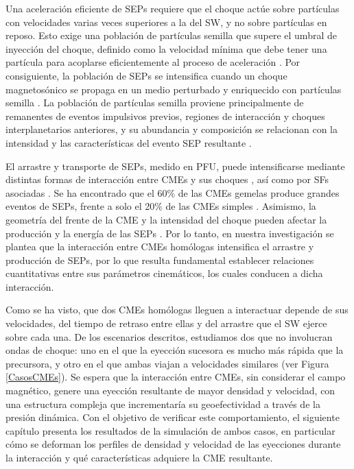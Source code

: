 Una aceleración eficiente de \acp{SEP} requiere que el choque actúe sobre partículas con velocidades varias veces superiores a la del \ac{SW}, y no sobre partículas en reposo. Esto exige una población de partículas semilla que supere el umbral de inyección del choque, definido como la velocidad mínima que debe tener una partícula para acoplarse eficientemente al proceso de aceleración \parencite{desai-2003, tylka-2006}. Por consiguiente, la población de SEPs se intensifica cuando un choque magnetosónico se propaga en un medio perturbado y enriquecido con partículas semilla \parencite[e.g.,][]{2004ApJ...616L.171S, gopalswamy-2004, lugaz-2005, li-2012}. La población de partículas semilla proviene principalmente de remanentes de eventos impulsivos previos, regiones de interacción y choques interplanetarios anteriores, y su abundancia y composición se relacionan con la intensidad y las características del evento \ac{SEP} resultante \parencite{kahler-2001, wijsen-2023}.

El arrastre y transporte de \acp{SEP}, medido en \ac{PFU}, puede intensificarse mediante distintas formas de interacción entre CMEs y sus choques \parencite[e.g.,][]{gopalswamy-2002, desai-2016, kahler-1987}, así como por \acp{SF} asociadas \parencite[e.g.,][]{lin-1976}. Se ha encontrado que el 60$\%$ de las \acp{CME} gemelas produce grandes eventos de SEPs, frente a solo el 20$\%$ de las \acp{CME} simples \parencite[e.g.,][]{lugaz-2017, ding-2013}. Asimismo, la geometría del frente de la \ac{CME} y la intensidad del choque pueden afectar la producción y la energía de las SEPs \parencite[e.g.,][]{kouloumvakos-2019}. Por lo tanto, en nuestra investigación se plantea que la interacción entre CMEs homólogas intensifica el arrastre y producción de \acp{SEP}, por lo que resulta fundamental establecer relaciones cuantitativas entre sus parámetros cinemáticos, los cuales conducen a dicha interacción.

Como se ha visto, que dos CMEs homólogas lleguen a interactuar depende de sus velocidades, del tiempo de retraso entre ellas y del arrastre que el \ac{SW} ejerce sobre cada una. De los escenarios descritos, estudiamos dos que no involucran ondas de choque: uno en el que la eyección sucesora es mucho más rápida que la precursora, y otro en el que ambas viajan a velocidades similares (ver Figura \ref{CasosCMEs}). Se espera que la interacción entre CMEs, sin considerar el campo magnético, genere una eyección resultante de mayor densidad y velocidad, con una estructura compleja que incrementaría su geoefectividad a través de la presión dinámica. Con el objetivo de verificar este comportamiento, el siguiente capítulo presenta los resultados de la simulación de ambos casos, en particular cómo se deforman los perfiles de densidad y velocidad de las eyecciones durante la interacción y qué características adquiere la CME resultante.